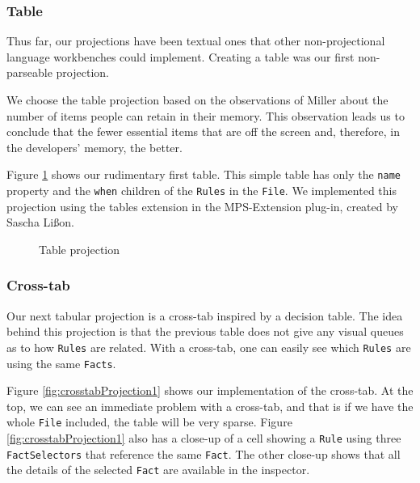 \subsubsection{Table}
Thus far, our projections have been textual ones that other non-projectional language workbenches could implement.
Creating a table was our first non-parseable projection.

We choose the table projection based on the observations of Miller\cite{miller1956magical} about the number of items people can retain in their memory.
This observation leads us to conclude that the fewer essential items that are off the screen and, therefore, in the developers' memory, the better.

Figure \ref{fig:tableProjection1} shows our rudimentary first table.
This simple table has only the \texttt{name} property and the \texttt{when} children of the \texttt{Rules} in the \texttt{File}.
We implemented this projection using the tables extension in the MPS-Extension plug-in, created by Sascha Lißon.

\begin{figure}
    \centering
    \caption{Table projection}
    \label{fig:tableProjection1}
\end{figure}

\subsubsection{Cross-tab}
Our next tabular projection is a cross-tab inspired by a decision table.
The idea behind this projection is that the previous table does not give any visual queues as to how \texttt{Rules} are related.
With a cross-tab, one can easily see which \texttt{Rules} are using the same \texttt{Facts}.

Figure \ref{fig:crosstabProjection1} shows our implementation of the cross-tab.
At the top, we can see an immediate problem with a cross-tab, and that is if we have the whole \texttt{File} included, the table will be very sparse.
Figure \ref{fig:crosstabProjection1} also has a close-up of a cell showing a \texttt{Rule} using three \texttt{FactSelectors} that reference the same \texttt{Fact}.
The other close-up shows that all the details of the selected \texttt{Fact} are available in the inspector.

